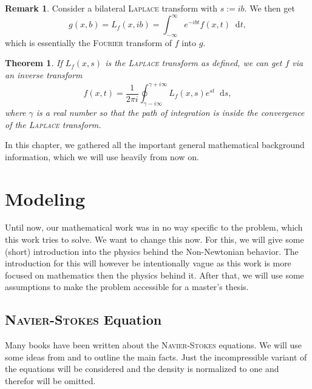 \documentclass[12pt,a4paper,twoside, open=right]{scrreprt}
\theoremstyle{definition}
\newtheorem{rem}[auf]{Remark}
\theoremstyle{plain}
\newtheorem{sa}[auf]{Theorem}
\newcommand{\D}{\mathop{}\!\mathrm{d}}
\begin{document}
\begin{rem}
    Consider a bilateral \textsc{Laplace} transform with $s:=ib$. We then get
    \begin{equation}
        g(x,b)=L_f(x,ib)=\int_{-\infty}^\infty e^{-ibt}f(x,t)\D t,
    \end{equation}
    which is essentially the \textsc{Fourier} transform of $f$ into $g$.
\end{rem}
\begin{sa}
    If $L_f(x,s) $ is the \textsc{Laplace} transform as defined, we can get $f$ via an inverse transform
    \begin{equation}
        f(x,t) = \frac{1}{2\pi i}\oint_{\gamma-i\infty}^{\gamma +i\infty}L_f(x,s)e^{st}\D s,
    \end{equation}
    where $\gamma$ is a real number so that the path of integration is inside the convergence of the \textsc{Laplace} transform.
\end{sa}
In this chapter, we gathered all the important general mathematical background information, which we will use heavily from now on. 
\chapter{Modeling}
Until now, our mathematical work was in no way specific to the problem, which this work tries to solve. We want to change this now. For this, we will give some (short) introduction into the physics behind the Non-Newtonian behavior. The introduction for this will however be intentionally vague as this work is more focused on mathematics then the physics behind it. After that, we will use some assumptions to make the problem accessible for a master's thesis.
\section{\textsc{Navier-Stokes} Equation}
Many books have been written about the \textsc{Navier-Stokes} equations. We will use some ideas from \cite{Lukaszewicz2016} and \cite{White2006} to outline the main facts. Just the incompressible variant of the equations will be considered and the density is normalized to one and therefor will be omitted.
\end{document}
